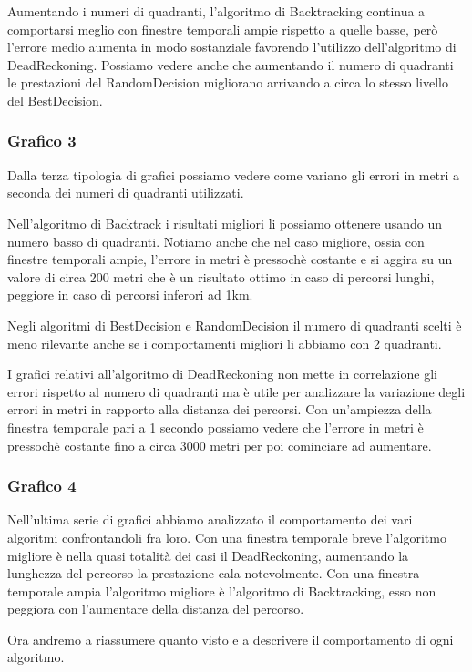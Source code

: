 \documentclass[12pt,a4paper,openright,twoside]{report}
\begin{document}
Aumentando i numeri di quadranti, l'algoritmo di Backtracking continua a comportarsi meglio con finestre temporali ampie rispetto a quelle basse, però l'errore medio aumenta in modo sostanziale favorendo l'utilizzo dell'algoritmo di DeadReckoning. Possiamo vedere anche che aumentando il numero di quadranti le prestazioni del RandomDecision migliorano arrivando a circa lo stesso livello del BestDecision.

\subsubsection{Grafico 3}
Dalla terza tipologia di grafici possiamo vedere come variano gli errori in metri a seconda dei numeri di quadranti utilizzati.

Nell'algoritmo di Backtrack i risultati migliori li possiamo ottenere usando un numero basso di quadranti. Notiamo anche che nel caso migliore, ossia con finestre temporali ampie, l'errore in metri è pressochè costante e si aggira su un valore di circa 200 metri che è un risultato ottimo in caso di percorsi lunghi, peggiore in caso di percorsi inferori ad 1km.

Negli algoritmi di BestDecision e RandomDecision il numero di quadranti scelti è meno rilevante anche se i comportamenti migliori li abbiamo con 2 quadranti.

I grafici relativi all'algoritmo di DeadReckoning non mette in correlazione gli errori rispetto al numero di quadranti ma è utile per analizzare la variazione degli errori in metri in rapporto alla distanza dei percorsi. Con un'ampiezza della finestra temporale pari a 1 secondo possiamo vedere che l'errore in metri è pressochè costante fino a circa 3000 metri per poi cominciare ad aumentare.

\subsubsection{Grafico 4}
Nell'ultima serie di grafici abbiamo analizzato il comportamento dei vari algoritmi confrontandoli fra loro.
Con una finestra temporale breve l'algoritmo migliore è nella quasi totalità dei casi il DeadReckoning, aumentando la lunghezza del percorso la prestazione cala notevolmente.
Con una finestra temporale ampia l'algoritmo migliore è l'algoritmo di Backtracking, esso non peggiora con l'aumentare della distanza del percorso.

\medskip
Ora andremo a riassumere quanto visto e a descrivere il comportamento di ogni algoritmo.
\end{document}
